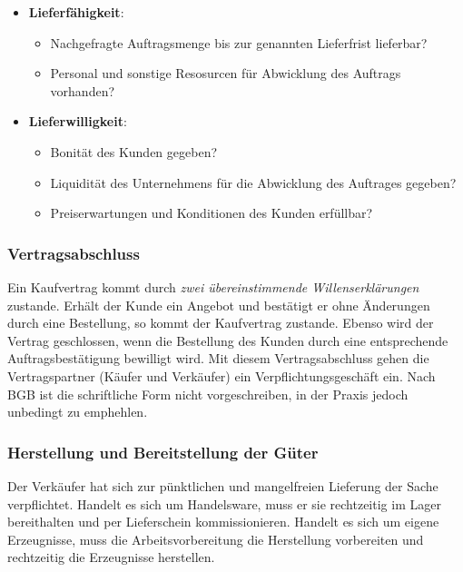 \documentclass[a4paper, 12pt]{report}
\begin{document}
\begin{itemize}
    \item \textbf{Lieferfähigkeit}: 
    \begin{itemize}
        \item Nachgefragte Auftragsmenge bis zur genannten Lieferfrist 
            lieferbar?
        \item Personal und sonstige Resosurcen für Abwicklung des Auftrags 
            vorhanden?
    \end{itemize}
    \item \textbf{Lieferwilligkeit}:
    \begin{itemize}
        \item Bonität des Kunden gegeben?
        \item Liquidität des Unternehmens für die Abwicklung des Auftrages 
            gegeben?
        \item Preiserwartungen und Konditionen des Kunden erfüllbar?
    \end{itemize} 
\end{itemize}

\subsubsection{Vertragsabschluss}

Ein Kaufvertrag kommt durch \emph{zwei übereinstimmende Willenserklärungen} 
zustande. Erhält der Kunde ein Angebot und bestätigt er ohne Änderungen durch 
eine Bestellung, so kommt der Kaufvertrag zustande. Ebenso wird der Vertrag 
geschlossen, wenn die Bestellung des Kunden durch eine entsprechende 
Auftragsbestätigung bewilligt wird. Mit diesem Vertragsabschluss gehen die 
Vertragspartner (Käufer und Verkäufer) ein Verpflichtungsgeschäft ein. Nach BGB
ist die schriftliche Form nicht vorgeschreiben, in der Praxis jedoch unbedingt 
zu emphehlen. 

\subsubsection{Herstellung und Bereitstellung der Güter}

Der Verkäufer hat sich zur pünktlichen und mangelfreien Lieferung der Sache 
verpflichtet. Handelt es sich um Handelsware, muss er sie rechtzeitig im Lager 
bereithalten und per Lieferschein kommissionieren. Handelt es sich um eigene 
Erzeugnisse, muss die Arbeitsvorbereitung die Herstellung vorbereiten und 
rechtzeitig die Erzeugnisse herstellen. 
\end{document}
